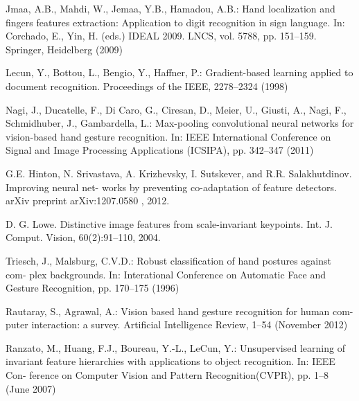 \documentclass[conference]{IEEEtran}
\begin{document}
%
%
%
\begin{thebibliography}{1}

Jmaa, A.B., Mahdi, W., Jemaa, Y.B., Hamadou, A.B.: Hand localization and fingers features extraction: Application to digit recognition in sign language. In: Corchado, E., Yin, H. (eds.) IDEAL 2009. LNCS, vol. 5788, pp. 151–159. Springer, Heidelberg (2009)

Lecun, Y., Bottou, L., Bengio, Y., Haffner, P.: Gradient-based learning applied to document recognition. Proceedings of the IEEE, 2278–2324 (1998)

Nagi, J., Ducatelle, F., Di Caro, G., Ciresan, D., Meier, U., Giusti, A., Nagi, F.,
Schmidhuber, J., Gambardella, L.: Max-pooling convolutional neural networks for
vision-based hand gesture recognition. In: IEEE International Conference on Signal
and Image Processing Applications (ICSIPA), pp. 342–347 (2011)

G.E. Hinton, N. Srivastava, A. Krizhevsky, I. Sutskever, and R.R. Salakhutdinov. Improving neural net-
works by preventing co-adaptation of feature detectors.
arXiv preprint arXiv:1207.0580
, 2012.

D. G. Lowe. Distinctive image features from scale-invariant keypoints. Int. J. Comput. Vision, 60(2):91–110, 2004.

Triesch, J., Malsburg, C.V.D.: Robust classification of hand postures against com-
plex backgrounds. In: Interational Conference on Automatic Face and Gesture
Recognition, pp. 170–175 (1996)

Rautaray, S., Agrawal, A.: Vision based hand gesture recognition for human com-
puter interaction: a survey. Artificial Intelligence Review, 1–54 (November 2012)

Ranzato, M., Huang, F.J., Boureau, Y.-L., LeCun, Y.: Unsupervised learning of
invariant feature hierarchies with applications to object recognition. In: IEEE Con-
ference on Computer Vision and Pattern Recognition(CVPR), pp. 1–8 (June 2007)
  
\end{thebibliography}




\end{document}
